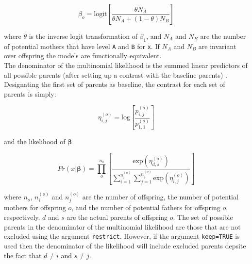 \documentclass{article}
\begin{document}
\begin{equation}
\beta_{o}  = \textrm{logit}\left[\frac{\theta N_{A}}{\theta N_{A} + (1-\theta)N_{B}}\right]
\end{equation}

where $\theta$ is the inverse logit transformation of $\beta_{1}$, and $N_{A}$ and $N_{B}$ are the number of potential mothers that have level \texttt{A} and \texttt{B} for \texttt{x}. If $N_{A}$ and $N_{B}$ are invariant over offspring the models are functionally equivalent.\\

The denominator of the multinomial likelihood is the summed linear predictors of all possible parents (after setting up a contrast with the baseline parents) \citep{Smouse.1999}.  Designating the first set of parents as baseline, the contrast for each set of parents is simply:

\begin{equation}
\eta^{(o)}_{i,j}  = \textrm{log}\left[\frac{p^{(o)}_{i,j}}{p^{(o)}_{1,1}}\right]
\end{equation}

and the likelihood of $\bm{\beta}$

\begin{equation}
Pr(x|\bm{\beta})  = \prod^{n_{o}}_{o}\left[\frac{\textrm{exp}(\eta^{(o)}_{d,s})}{\sum^{n^{(o)}_{i}}_{i=1}\sum^{n^{(o)}_{j}}_{j=1}\textrm{exp}(\eta^{(o)}_{i,j})}\right] 
\end{equation}

where $n_{o}$, $n^{(o)}_{i}$ and $n^{(o)}_{j}$ are the number of offspring, the number of potential mothers for offspring $o$, and the number of potential fathers for offspring $o$, respectively.  $d$ and $s$ are the actual parents of offspring $o$. The set of possible parents  in the denominator of the multinomial likelihood are those that are not excluded using the argument \texttt{restrict}. However, if the argument \texttt{keep=TRUE} is used then the denominator of the likelihood will include excluded parents depsite the fact that $d \neq i$ and $s \neq j$.




\end{document}
